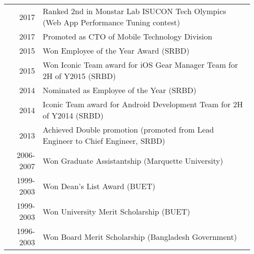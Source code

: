 \documentclass[10pt,a4paper]{article} %
\begin{document}
\spacedhrule{1.6em}{-0.4em} %


{}


\spacedhrule{1.6em}{-0.4em} %

\begin{longtable}{rl}
2017	   &    Ranked 2nd in Monstar Lab ISUCON Tech Olympics (Web App Performance Tuning contest) \\
2017   &     Promoted as CTO of Mobile Technology Division \\
2015	   &    Won Employee of the Year Award (SRBD)\\
2015	   &    Won Iconic Team award for iOS Gear Manager Team for 2H of Y2015 (SRBD)\\
2014   &    Nominated as Employee of the Year (SRBD)\\
2014	   &    Iconic Team award for Android Development Team for 2H of Y2014 (SRBD)\\
2013   &    Achieved Double promotion (promoted from Lead Engineer to Chief Engineer, SRBD) \\
2006-2007 &    Won Graduate Assistantship (Marquette University)\\
1999-2003 &    Won Dean's List Award (BUET)\\
1999-2003 &    Won University Merit Scholarship (BUET)\\
1996-2003 &    Won Board Merit Scholarship (Bangladesh Government)
\end{longtable}
\end{document}
